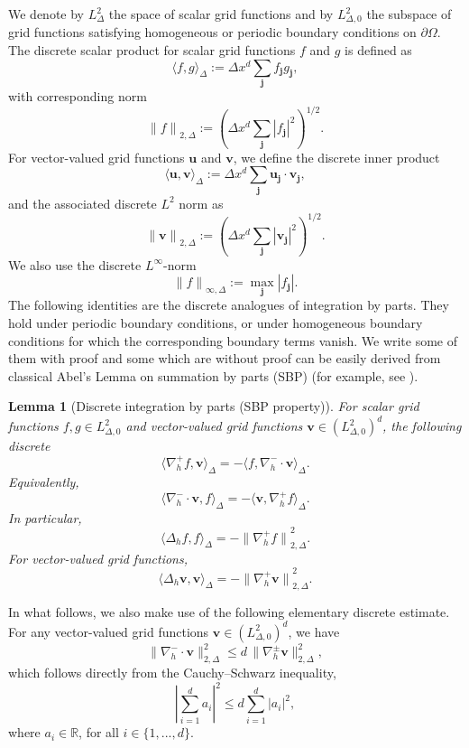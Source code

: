 \documentclass[11pt]{article}
\numberwithin{equation}{section}
\newtheorem{lemma}[theorem]{Lemma}
\newtheorem{counter example}[theorem]{Counter Example}
\numberwithin{equation}{section}
\numberwithin{equation}{section}
\begin{document}
We denote by $L_{\Delta}^2$ the space of scalar grid functions and by $L_{\Delta,0}^2$ the subspace of grid functions satisfying homogeneous or periodic boundary conditions on $\partial\Omega$. The discrete scalar product for scalar grid functions $f$ and $g$ is defined as 
\[
{\langle f,g\rangle}_\Delta:=\Delta x^d\sum_{\mathbf j} f_{\mathbf j}g_{\mathbf j},
\]
with corresponding norm
\[
{\|f\|}_{2, \Delta}:=\left(\Delta x^d\sum_{\mathbf j}|f_{\mathbf j}|^2\right)^{1/2}.
\]
For vector-valued grid functions $\mathbf u$ and $\mathbf v$, we define the discrete inner product
\[
{\langle \mathbf u,\mathbf v\rangle}_\Delta:=\Delta x^d\sum_{\mathbf j}\mathbf u_{\mathbf j}\cdot\mathbf v_{\mathbf j},
\]
and the associated discrete $L^2$ norm as
\[
{\|\mathbf v\|}_{2, \Delta}:=\left(\Delta x^d\sum_{\mathbf j}|\mathbf v_{\mathbf j}|^2\right)^{1/2}.
\]
We also use the discrete $L^\infty$-norm
\[
{\|f\|}_{\infty,\Delta}:=\max_{\mathbf j}|f_{\mathbf j}|.
\]
The following identities are the discrete analogues of integration by parts. They hold under periodic boundary conditions, or under homogeneous boundary conditions for which the corresponding boundary terms vanish. We write some of them with proof and some which are without proof can be easily derived from classical Abel’s Lemma on summation by parts (SBP) (for example, see \cite{chu2007abel}). 
\begin{lemma}[Discrete integration by parts (SBP property)]
\label{lemma:discrete_ibp}
For scalar grid functions $f,g\in L_{\Delta,0}^2$ and vector-valued grid functions $\mathbf v\in (L_{\Delta,0}^2)^d$, the following discrete 
\[
{\langle \nabla_h^+ f,\mathbf v\rangle}_\Delta
=
-{\langle f,\nabla_h^-\cdot\mathbf v\rangle}_\Delta.
\]
Equivalently,
\[
{\langle\nabla_h^-\cdot\mathbf v,f\rangle}_\Delta
=
-{\langle\mathbf v,\nabla_h^+ f\rangle}_\Delta.
\]
In particular,
\[
{\langle\Delta_h f,f\rangle}_\Delta
=
-{\|\nabla_h^+f\|}_{2, \Delta}^2.
\]
For vector-valued grid functions,
\[
{\langle\Delta_h\mathbf v,\mathbf v\rangle}_\Delta
=
-{\|\nabla_h^+\mathbf v\|}_{2, \Delta}^2.
\]
\end{lemma}
In what follows, we also make use of the following elementary discrete estimate. For any vector-valued grid functions $\mathbf v\in (L_{\Delta,0}^2)^d$, we have
\begin{equation}
\label{eq:div_less_grad}
    \|\nabla_h^-\cdot\mathbf v\|_{2, \Delta}^2
\le d\,\|\nabla_h^\pm\mathbf v\|_{2, \Delta}^2,
\end{equation}
which follows directly from the Cauchy--Schwarz inequality,
\begin{equation}
\left|\sum_{i=1}^d a_i\right|^2
\le d\sum_{i=1}^d |a_i|^2,
\end{equation}
where $a_i\in\mathbb{R}$, for all $i\in\{1,...,d\}$.
\end{document}
